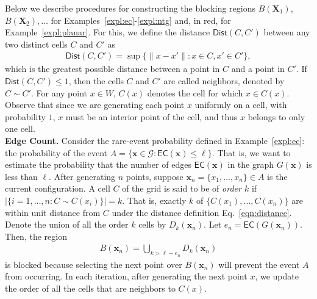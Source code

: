 \documentclass[pdflatex, sn-mathphys-ay]{sn-jnl}%
\renewcommand{\v}[1]{\boldsymbol{#1}}
\newcommand{\cB}{B}
\newcommand{\mx}{\v{x}}
\newcommand{\mX}{\v{X}}
\newcommand{\scG}{\mathscr{G}}
\newcommand{\ec}{\mathsf{EC}}
\theoremstyle{thmstyleone}%
\theoremstyle{thmstyletwo}%
\theoremstyle{thmstylethree}%
\begin{document}
Below we describe procedures for constructing the blocking regions $\cB(\mX_1)$, $\cB(\mX_2), \dots$ for Examples~\ref{expl:ec}-\ref{expl:ntg} and, in red, for Example~\ref{expl:planar}.  
For this, we define the distance $\mathsf{Dist}(C, C')$ between any two distinct cells $C$ and $C'$ as
\begin{align}
\mathsf{Dist}(C, C') = \sup\big\{\|x - x'\| : x \in C, x'\in C'\big\},
\label{eqn:distance}
\end{align}
which is the  greatest possible distance between a point in $C$ and a point in $C'$.  
If ${\mathsf{Dist}(C, C') \leq 1}$, then the cells $C$ and $C'$ are called neighbors, denoted by $C \sim C'$.
For any point $x \in W$, $C(x)$ denotes the cell for which $x \in C(x)$. Observe that since we are generating each point $x$ uniformly on a cell, with probability $1$, $x$ must be an interior point of the cell, and thus $x$ belongs to only one cell.\\


\noindent
{\bf Edge Count.} Consider the rare-event probability defined in Example~\ref{expl:ec}: the probability of the event
$A = \{\mx \in \scG : \ec(\mx) \leq \ell \}$. That is, we want to estimate the probability that the number of edges $\ec(\mx)$ in the graph $G(\mx)$ is less than $\ell$. After generating $n$ points, suppose $\mx_n = \{x_1, \dots, x_n\} \in A$ is the current configuration.  A cell $C$ of the grid is said to be of {\em order $k$} if 
$\big| \{ i = 1, \dots, n : C \sim C(x_i) \}\big| = k$.
That is, exactly $k$ of $\{C(x_1), \dots, C(x_n)\}$ are within unit distance from $C$ under the distance definition Eq.~\eqref{eqn:distance}. 
Denote the union of all the order $k$ cells by $D_k(\mx_n)$. Let $e_n = \ec(G(\mx_n))$. Then, the region
\begin{align*}
\cB(\mx_n) = \bigcup_{k >  \ell - e_n} D_{k}(\mx_{n})
\end{align*}
is blocked because selecting the next point over $\cB(\mx_n)$ will prevent the event $A$ from occurring. 
In each iteration, after generating the next point $x$, we update the order of all the cells that are neighbors to $C(x)$.\\
\end{document}
